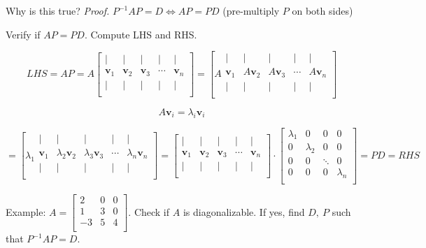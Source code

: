 \documentclass[12pt]{article}
\theoremstyle{plain}
\theoremstyle{remark}
\theoremstyle{definition}
\begin{document}
Why is this true? \emph{Proof.}
\(P^{- 1}AP = D \Leftrightarrow AP = PD\) (pre-multiply \(P\) on both
sides)

Verify if \(AP = PD\). Compute LHS and RHS.

\[{LHS = AP }{= A\begin{bmatrix}
 \mid & \mid & \mid & \mid & \mid \\
{\mathbf{v}}_{1} & {\mathbf{v}}_{2} & {\mathbf{v}}_{3} & \cdots & {\mathbf{v}}_{n} \\
 \mid & \mid & \mid & \mid & \mid \\
\end{bmatrix} }{= \left\lbrack A\begin{matrix}
 \mid & \mid & \mid & \mid & \mid \\
{\mathbf{v}}_{1} & A{\mathbf{v}}_{2} & A{\mathbf{v}}_{3} & \cdots & A{\mathbf{v}}_{n} \\
 \mid & \mid & \mid & \mid & \mid \\
\end{matrix} \right\rbrack} \]

\[A{\mathbf{v}}_{i} = \lambda_{i}{\mathbf{v}}_{i}\]

\[{}{= \left\lbrack \lambda_{1}\begin{matrix}
 \mid & \mid & \mid & \mid & \mid \\
{\mathbf{v}}_{1} & \lambda_{2}{\mathbf{v}}_{2} & \lambda_{3}{\mathbf{v}}_{3} & \cdots & \lambda_{n}{\mathbf{v}}_{n} \\
 \mid & \mid & \mid & \mid & \mid \\
\end{matrix} \right\rbrack }{= \begin{bmatrix}
 \mid & \mid & \mid & \mid & \mid \\
{\mathbf{v}}_{1} & {\mathbf{v}}_{2} & {\mathbf{v}}_{3} & \cdots & {\mathbf{v}}_{n} \\
 \mid & \mid & \mid & \mid & \mid \\
\end{bmatrix} \cdot \begin{bmatrix}
\lambda_{1} & 0 & 0 & 0 \\
0 & \lambda_{2} & 0 & 0 \\
0 & 0 & \ddots & 0 \\
0 & 0 & 0 & \lambda_{n} \\
\end{bmatrix} }{= PD = RHS} \]

Example: \(A = \begin{bmatrix}
2 & 0 & 0 \\
1 & 3 & 0 \\
 - 3 & 5 & 4 \\
\end{bmatrix}\). Check if \(A\) is diagonalizable. If yes, find
\(D,\ P\) such that \(P^{- 1}AP = D\).
\end{document}
